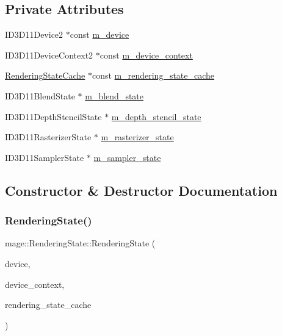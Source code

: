 \subsection*{Private Attributes}
\begin{DoxyCompactItemize}
\item 
I\+D3\+D11\+Device2 $\ast$const \hyperlink{structmage_1_1_rendering_state_a7985712bda141bfac079d4fb6d85cfec}{m\+\_\+device}
\item 
I\+D3\+D11\+Device\+Context2 $\ast$const \hyperlink{structmage_1_1_rendering_state_a13e46783f38a60fe032dc2aad708ec48}{m\+\_\+device\+\_\+context}
\item 
\hyperlink{structmage_1_1_rendering_state_cache}{Rendering\+State\+Cache} $\ast$const \hyperlink{structmage_1_1_rendering_state_a8d422a14392f89eec1ece2d917511168}{m\+\_\+rendering\+\_\+state\+\_\+cache}
\item 
I\+D3\+D11\+Blend\+State $\ast$ \hyperlink{structmage_1_1_rendering_state_ab08e5f63a1bd463ce6029eaaf3526ae4}{m\+\_\+blend\+\_\+state}
\item 
I\+D3\+D11\+Depth\+Stencil\+State $\ast$ \hyperlink{structmage_1_1_rendering_state_a2428412ad160c0d4dd2538c3a9cc863f}{m\+\_\+depth\+\_\+stencil\+\_\+state}
\item 
I\+D3\+D11\+Rasterizer\+State $\ast$ \hyperlink{structmage_1_1_rendering_state_a63b8c00bd0e2e1c56bd2a42f269733a8}{m\+\_\+rasterizer\+\_\+state}
\item 
I\+D3\+D11\+Sampler\+State $\ast$ \hyperlink{structmage_1_1_rendering_state_a88c58f587b9670d662aef5a3a52fa38d}{m\+\_\+sampler\+\_\+state}
\end{DoxyCompactItemize}


\subsection{Constructor \& Destructor Documentation}
\hypertarget{structmage_1_1_rendering_state_a6a1914effafb160ff1d05c8a1963278a}{}\label{structmage_1_1_rendering_state_a6a1914effafb160ff1d05c8a1963278a} 
\subsubsection{\texorpdfstring{Rendering\+State()}{RenderingState()}\hspace{0.1cm}{\footnotesize\ttfamily [1/3]}}
{\footnotesize\ttfamily mage\+::\+Rendering\+State\+::\+Rendering\+State (\begin{DoxyParamCaption}\item[{I\+D3\+D11\+Device2 $\ast$}]{device,  }\item[{I\+D3\+D11\+Device\+Context2 $\ast$}]{device\+\_\+context,  }\item[{\hyperlink{structmage_1_1_rendering_state_cache}{Rendering\+State\+Cache} $\ast$}]{rendering\+\_\+state\+\_\+cache }\end{DoxyParamCaption})}

